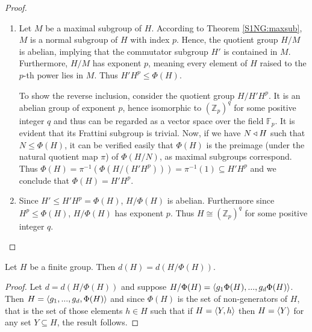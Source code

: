 \begin{proof}
    \begin{enumerate}
        \item Let $M$ be a maximal subgroup of $H$. According to Theorem \ref{S1NG:maxsub}, $M$ is a normal subgroup of $H$ with index $p$. 
        Hence, the quotient group $H/M$ is abelian, implying that the commutator subgroup $H'$ is contained in $M$. 
        Furthermore, $H/M$ has exponent $p$, meaning every element of $H$ raised to the $p$-th power lies in $M$. 
        Thus $H'H^p \le \Phi(H)$.

        To show the reverse inclusion, consider the quotient group $H/H'H^p$.
        It is an abelian group of exponent $p$, hence isomorphic to $(\mathbb{Z}_p)^q$ for some positive integer $q$ and thus can be regarded as a vector space over the field $\mathbb{F}_p$.
        It is evident that its Frattini subgroup is trivial.
        Now, if we have $N \triangleleft H$ such that $N \le \Phi(H)$, it can be verified easily that $\Phi(H)$ is the preimage (under the natural quotient map $\pi$) of $\Phi(H/N)$, as maximal subgroups correspond.
        Thus $\Phi(H) = \pi^{-1}(\Phi(H/(H'H^p))) = \pi^{-1}(1) \subseteq H'H^p$ and we conclude that $\Phi(H) = H'H^p$.

        \item Since $H' \le H'H^p = \Phi(H)$, $H/\Phi(H)$ is abelian. Furthermore since $H^p \le \Phi(H)$, $H/\Phi(H)$ has exponent $p$.
        Thus $H \cong (\mathbb{Z}_p)^q$ for some positive integer $q$.

    \end{enumerate}
\end{proof}

\begin{theorem}
\label{th:fratgen}
Let $H$ be a finite group. Then $d(H) = d(H/\Phi(H))$.
\end{theorem}
\begin{proof}
    Let $d = d(H/\Phi(H))$ and suppose $H/\Phi(H) = \langle g_1\Phi(H),...,g_d\Phi(H) \rangle$. 
    Then $H = \langle g_1,...,g_d,\Phi(H) \rangle$ and since $\Phi(H)$ is the set of non-generators of $H$, that is the set of those elements $h \in H$ such that if $H = \langle Y, h \rangle$ then $H = \langle Y \rangle$ for any set $Y \subseteq H$, the result follows.
\end{proof}
